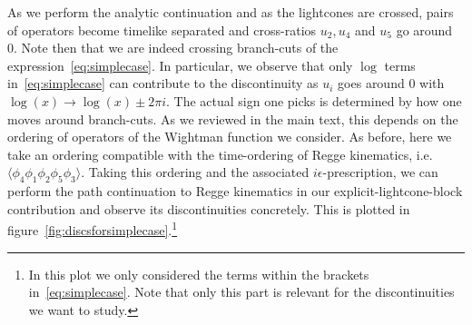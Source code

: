 As we perform the analytic continuation and as the lightcones are crossed, pairs of operators become timelike separated and cross-ratios $u_2, u_4$ and $u_5$ go around 0. Note then that we are indeed crossing branch-cuts of the expression~\eqref{eq:simplecase}. In particular, we observe that only $\log$ terms in~\eqref{eq:simplecase} can contribute to the discontinuity as $u_i$ goes around 0 with $\log(x)\to \log(x)\pm 2\pi i$. The actual sign one picks is determined by how one moves around branch-cuts. As we reviewed in the main text, this depends on the ordering of operators of the Wightman function we consider. As before, here we take an ordering compatible with the time-ordering of Regge kinematics, i.e. $\langle \phi_4 \phi_1 \phi_2  \phi_5 \phi_3\rangle$. Taking this ordering and the associated $i\epsilon$-prescription, we can perform the path continuation to Regge kinematics in our explicit-lightcone-block contribution and observe its discontinuities concretely. This is plotted in figure~\ref{fig:discsforsimplecase}.\footnote{In this plot we only considered the terms within the brackets in~\eqref{eq:simplecase}. Note that only this part is relevant for the discontinuities we want to study.}
